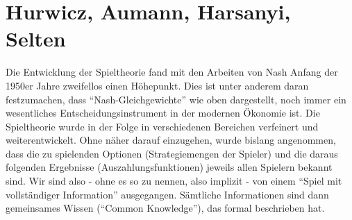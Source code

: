 \section{Hurwicz, Aumann, Harsanyi, Selten}

Die Entwicklung der Spieltheorie fand mit den Arbeiten von Nash Anfang der 1950er Jahre zweifellos einen Höhepunkt. Dies ist unter anderem daran festzumachen, dass "`Nash-Gleichgewichte"' wie oben dargestellt, noch immer ein wesentliches Entscheidungsinstrument in der modernen Ökonomie ist. Die Spieltheorie wurde in der Folge in verschiedenen Bereichen verfeinert und weiterentwickelt. Ohne näher darauf einzugehen, wurde bislang angenommen, dass die zu spielenden Optionen (Strategiemengen der Spieler) und die daraus folgenden Ergebnisse (Auszahlungsfunktionen) jeweils allen Spielern bekannt sind. Wir sind also - ohne es so zu nennen, also implizit - von einem "`Spiel mit vollständiger Information"' ausgegangen. Sämtliche Informationen sind dann gemeinsames Wissen ("`Common Knowledge"'), das \textcite{Aumann1976} formal beschrieben hat.

